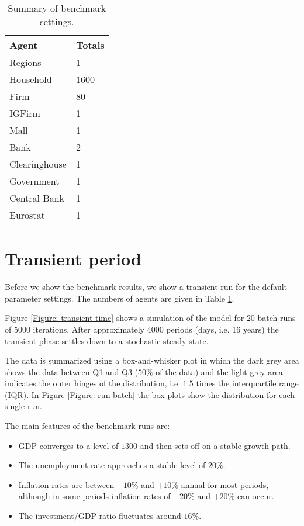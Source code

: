 \begin{table}[tbp]
\caption{Summary of benchmark settings.}
\label{Table: Benchmark Settings}\centering
\begin{tabular}{ll}
\hline\hline
Agent           & Totals\\
\hline
Regions         & 1\\
\hline
Household       & 1600\\
Firm            & 80\\
IGFirm          & 1\\
Mall            & 1\\
Bank            & 2\\
Clearinghouse   & 1\\
Government      & 1\\
Central Bank    & 1\\
Eurostat        & 1\\
\hline
\end{tabular}%
\end{table}


\section{Transient period}
Before we show the benchmark results, we show a transient run for the default parameter settings.
The numbers of agents are given in Table \ref{Table: Benchmark Settings}.

Figure \ref{Figure: transient time} shows a simulation of the model for $20$ batch runs of $5000$ iterations.
After approximately $4000$ periods (days, i.e. 16 years) the transient phase settles down to a stochastic steady state.

The data is summarized using a box-and-whisker plot in which the dark grey area shows the data between Q1 and Q3 ($50\%$ of the data) and
 the light grey area indicates the outer hinges of the distribution, i.e. $1.5$ times the interquartile range (IQR).
In Figure \ref{Figure: run batch} the box plots show the distribution for each single run.

\bigskip
The main features of the benchmark runs are:
\begin{itemize}
\item GDP converges to a level of $1300$ and then sets off on a stable growth path.
\item The unemployment rate approaches a stable level of $20\%$.
\item Inflation rates are between $-10\%$ and $+10\%$ annual for most periods,
although in some periods inflation rates of $-20\%$ and $+20\%$ can occur.
\item The investment/GDP ratio fluctuates around $16\%$.
\end{itemize}

